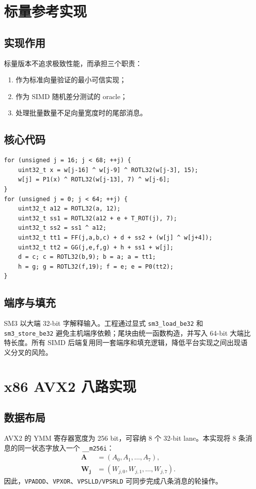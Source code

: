 \documentclass[UTF8,a4paper,12pt]{ctexart}
\newcommand{\code}[1]{\texttt{#1}}
\newcommand{\vect}[1]{\bm{#1}}
\begin{document}
\section{标量参考实现}

\subsection{实现作用}
标量版本不追求极致性能，而承担三个职责：
\begin{enumerate}
  \item 作为标准向量验证的最小可信实现；
  \item 作为 SIMD 随机差分测试的 oracle；
  \item 处理批量数量不足向量宽度时的尾部消息。
\end{enumerate}

\subsection{核心代码}
\begin{lstlisting}[style=cstyle,caption={标量消息扩展与压缩核心（节选）}]
for (unsigned j = 16; j < 68; ++j) {
    uint32_t x = w[j-16] ^ w[j-9] ^ ROTL32(w[j-3], 15);
    w[j] = P1(x) ^ ROTL32(w[j-13], 7) ^ w[j-6];
}
for (unsigned j = 0; j < 64; ++j) {
    uint32_t a12 = ROTL32(a, 12);
    uint32_t ss1 = ROTL32(a12 + e + T_ROT(j), 7);
    uint32_t ss2 = ss1 ^ a12;
    uint32_t tt1 = FF(j,a,b,c) + d + ss2 + (w[j] ^ w[j+4]);
    uint32_t tt2 = GG(j,e,f,g) + h + ss1 + w[j];
    d = c; c = ROTL32(b,9); b = a; a = tt1;
    h = g; g = ROTL32(f,19); f = e; e = P0(tt2);
}
\end{lstlisting}

\subsection{端序与填充}
SM3 以大端 32-bit 字解释输入。工程通过显式 \code{sm3\_load\_be32} 和 \code{sm3\_store\_be32} 避免主机端序依赖；尾块由统一函数构造，并写入 64-bit 大端比特长度。所有 SIMD 后端复用同一套端序和填充逻辑，降低平台实现之间出现语义分叉的风险。

\section{x86 AVX2 八路实现}

\subsection{数据布局}
AVX2 的 YMM 寄存器宽度为 256 bit，可容纳 8 个 32-bit lane。本实现将 8 条消息的同一状态字放入一个 \code{\_\_m256i}：
\begin{align*}
\vect{A}&=(A_0,A_1,\ldots,A_7),\\
\vect{W_j}&=(W_{j,0},W_{j,1},\ldots,W_{j,7}).
\end{align*}
因此，\code{VPADDD}、\code{VPXOR}、\code{VPSLLD/VPSRLD} 可同步完成八条消息的轮操作。
\end{document}
